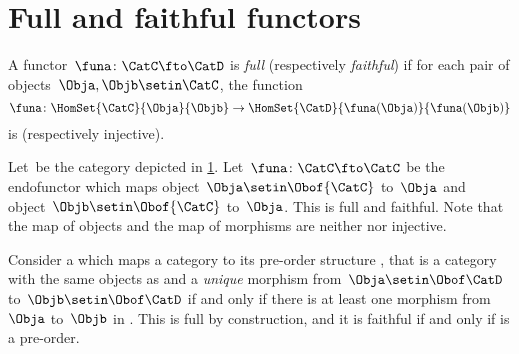 
\section{Full and faithful functors}

\begin{ctdefinition}
    \label{def:functorfullfaith}
    A functor~$\funa\colon \CatC \fto \CatD$ is \emph{full} (respectively \emph{faithful}) if for each pair of objects~$\Obja,\Objb\setin \CatC$, the function
    \begin{equation}
        \funa \colon \HomSet{\CatC}{\Obja}{\Objb} \to \HomSet{\CatD}{\funa(\Obja)}{\funa(\Objb)}
    \end{equation}
    is  (respectively injective).
\end{ctdefinition}

\begin{example}
    Let~\CatC be the category depicted in \cref{fig:ex_full_faithful_1}.
    Let~$\funa\colon \CatC \fto \CatC$ be the endofunctor which maps object~$\Obja\setin \Obof{\CatC}$ to~$\Obja$ and object~$\Objb\setin \Obof{\CatC}$ to~$\Obja$.
    This  is full and faithful.
    Note that the map of objects and the map of morphisms are neither  nor injective.

    \begin{figure}[h!]
        \centering
        \caption{}
        \label{fig:ex_full_faithful_1}
    \end{figure}
\end{example}

\begin{example}
    Consider a  which maps a category \CatC to its pre-order structure \CatD, that is a category with the same objects as \CatC and a \emph{unique} morphism from~$\Obja\setin \Obof\CatD$ to~$\Objb\setin \Obof\CatD$ if and only if there is at least one morphism from~$\Obja$ to~$\Objb$ in \CatC.
    This  is full by construction, and it is faithful if and only if \CatC is a pre-order.
\end{example}

